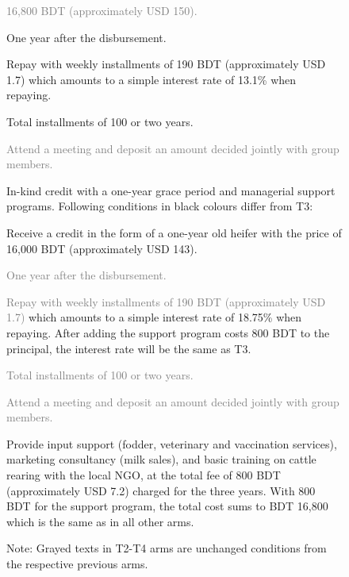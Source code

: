 \begin{figure}
{{\begin{description}
		\begin{description}
		\vspace{1ex}\setlength{\itemsep}{.5ex}\setlength{\baselineskip}{8pt}
		\item[\textcolor{gray}{Credit}]	\textcolor{gray}{16,800 BDT (approximately USD 150).}
		\item[Repayment start]	One year after the disbursement.
		\item[Installments]	Repay with weekly installments of 190 BDT (approximately USD 1.7) which amounts to a simple interest rate of 13.1\% when repaying.
		\item[Maturity]	Total installments of 100 or two years. 
		\item[\textcolor{gray}{Weekly obligations}]	\textcolor{gray}{Attend a meeting and deposit an amount decided jointly with group members.}
		\end{description}
	\item[T4]	In-kind credit with a one-year grace period and managerial support programs. Following conditions in black colours differ from \textsf{T3}:
		\begin{description}
		\vspace{1ex}\setlength{\itemsep}{.5ex}\setlength{\baselineskip}{8pt}
		\item[Credit]	Receive a credit in the form of a one-year old heifer with the price of 16,000 BDT (approximately USD 143).
		\item[\textcolor{gray}{Repayment start}]	\textcolor{gray}{One year after the disbursement.}
		\item[\textcolor{gray}{Installments}]	\textcolor{gray}{Repay with weekly installments of 190 BDT (approximately USD 1.7)} which amounts to a simple interest rate of 18.75\% when repaying. After adding the support program costs 800 BDT to the principal, the interest rate will be the same as \textsf{T3}.
		\item[\textcolor{gray}{Maturity}]	\textcolor{gray}{Total installments of 100 or two years. }
		\item[\textcolor{gray}{Weekly obligations}]	\textcolor{gray}{Attend a meeting and deposit an amount decided jointly with group members.}
		\item[Support program] 	Provide input support (fodder, veterinary and vaccination services), marketing consultancy (milk sales), and basic training on cattle rearing with the local NGO, at the total fee of 800 BDT (approximately USD 7.2) charged for the three years. With 800 BDT for the support program, the total cost sums to BDT 16,800 which is the same as in all other arms.
		\end{description}
	\setlength{\baselineskip}{12pt}
	\end{description}
	}

Note: Grayed texts in \textsf{T2}-\textsf{T4} arms are unchanged conditions from the respective previous arms.
}
\end{figure}

